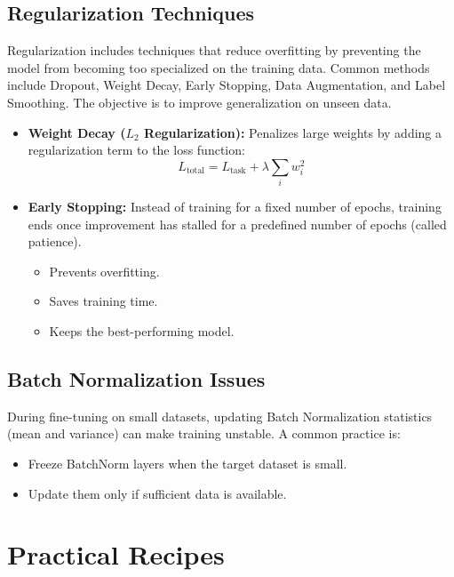 \subsection{Regularization Techniques}
Regularization includes techniques that reduce overfitting by preventing the model from becoming too specialized on the training data. Common methods include Dropout, Weight Decay, Early Stopping, Data Augmentation, and Label Smoothing. The objective is to improve generalization on unseen data.

\begin{itemize}
    \item \textbf{Weight Decay ($L_2$ Regularization):} Penalizes large weights by adding a regularization term to the loss function:
    \begin{equation}
    L_{\text{total}} = L_{\text{task}} + \lambda \sum_i w_i^2
    \end{equation}
    
    \item \textbf{Early Stopping:} Instead of training for a fixed number of epochs, training ends once improvement has stalled for a predefined number of epochs (called patience).
    \begin{itemize}
        \item Prevents overfitting.
        \item Saves training time.
        \item Keeps the best-performing model.
    \end{itemize}
\end{itemize}

\subsection{Batch Normalization Issues}
During fine-tuning on small datasets, updating Batch Normalization statistics (mean and variance) can make training unstable. A common practice is:
\begin{itemize}
    \item Freeze BatchNorm layers when the target dataset is small.
    \item Update them only if sufficient data is available.
\end{itemize}

\section{Practical Recipes}

